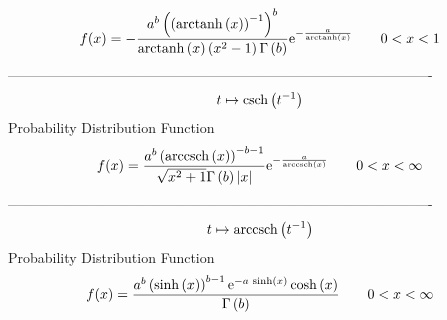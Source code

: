 \documentclass[12pt]{article}
\begin{document}
$$  f(x)=-{\frac {{a}^{b} \left(  \left( {\rm arctanh} \left(x\right) \right) ^
{-1} \right) ^{b}}{{\rm arctanh} \left(x\right) \left( {x}^{2}-1
 \right) \Gamma \left( b \right) }{{\rm e}^{-{\frac {a}{{\rm arctanh} 
\left(x\right)}}}}}
 \qquad0
 < x < 1
$$-------------------------------------------------------------------------------------------  \\$$t\mapsto {\rm csch} \left({t}^{-1}\right)
$$Probability Distribution Function 
$$  f(x)={\frac {{a}^{b} \left( {\rm arccsch} \left(x\right) \right) ^{-b-1}}{
\sqrt {{x}^{2}+1}\Gamma \left( b \right)  \left| x \right| }{{\rm e}^{
-{\frac {a}{{\rm arccsch} \left(x\right)}}}}}
 \qquad0
 < x < \infty 
$$-------------------------------------------------------------------------------------------  \\$$t\mapsto {\rm arccsch} \left({t}^{-1}\right)
$$Probability Distribution Function 
$$  f(x)={\frac {{a}^{b} \left( \sinh \left( x \right)  \right) ^{b-1}{{\rm e}^
{-a\,\sinh \left( x \right) }}\cosh \left( x \right) }{\Gamma \left( b
 \right) }}
 \qquad0
 < x < \infty 
$$
\end{document}
